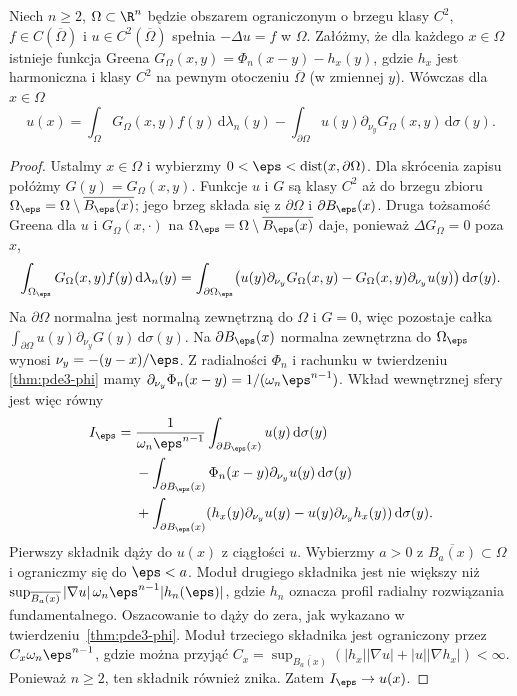 \begin{twierdzenie}
\label{thm:pde3-representation}
Niech $n\geq2$, $\Omega\subset\R^n$ będzie obszarem ograniczonym o brzegu klasy $C^2$, $f\in C(\overline\Omega)$
i $u\in C^2(\overline\Omega)$ spełnia $-\Delta u=f$
w $\Omega$. Załóżmy, że dla każdego $x\in\Omega$
istnieje funkcja Greena $G_\Omega(x,y)=\Phi_n(x-y)-h_x(y)$,
gdzie $h_x$ jest harmoniczna i klasy $C^2$ na pewnym
otoczeniu $\overline\Omega$ (w zmiennej $y$).
Wówczas dla $x\in\Omega$
\begin{equation}\label{eq:pde3-green-representation}
 u(x)=\int_\Omega G_\Omega(x,y)f(y)\,\mathrm d\lambda_n(y)
 -\int_{\partial\Omega}u(y)\partial_{\nu_y}G_\Omega(x,y)
 \,\mathrm d\sigma(y).
\end{equation}
\end{twierdzenie}
\begin{proof}
Ustalmy $x\in\Omega$ i wybierzmy
$0<\eps<\operatorname{dist}(x,\partial\Omega)$.
Dla skrócenia zapisu połóżmy $G(y)=G_\Omega(x,y)$.
Funkcje $u$ i $G$ są klasy $C^2$ aż do brzegu
zbioru $\Omega_\eps=\Omega\setminus\overline{B_\eps(x)}$;
jego brzeg składa się z $\partial\Omega$ i $\partial B_\eps(x)$.
Druga tożsamość Greena dla $u$ i $G_\Omega(x,\cdot)$
na $\Omega_\eps=\Omega\setminus\overline{B_\eps(x)}$
daje, ponieważ $\Delta G_\Omega=0$ poza $x$,
\[
 \int_{\Omega_\eps}G_\Omega(x,y)f(y)\,\mathrm d\lambda_n(y)
 =\int_{\partial\Omega_\eps}
 \bigl(u(y)\partial_{\nu_y}G_\Omega(x,y)
 -G_\Omega(x,y)\partial_{\nu_y}u(y)\bigr)
 \,\mathrm d\sigma(y).
\]
Na $\partial\Omega$ normalna jest normalną zewnętrzną
do $\Omega$ i $G=0$, więc pozostaje całka
$\int_{\partial\Omega}u(y)\partial_{\nu_y}G(y)\,
\mathrm d\sigma(y)$.
Na $\partial B_\eps(x)$ normalna zewnętrzna
do $\Omega_\eps$ wynosi $\nu_y=-(y-x)/\eps$.
Z radialności $\Phi_n$ i rachunku w twierdzeniu
\ref{thm:pde3-phi} mamy
$\partial_{\nu_y}\Phi_n(x-y)=1/(\omega_n\eps^{n-1})$.
Wkład wewnętrznej sfery jest więc równy
\[
 \begin{aligned}
 I_\eps={}&\frac1{\omega_n\eps^{n-1}}
 \int_{\partial B_\eps(x)}u(y)\,\mathrm d\sigma(y)\\
 &-\int_{\partial B_\eps(x)}
 \Phi_n(x-y)\partial_{\nu_y}u(y)\,\mathrm d\sigma(y)\\
 &+\int_{\partial B_\eps(x)}
 (h_x(y)\partial_{\nu_y}u(y)
 -u(y)\partial_{\nu_y}h_x(y))\,\mathrm d\sigma(y).
 \end{aligned}
\]
Pierwszy składnik dąży do $u(x)$ z ciągłości $u$.
Wybierzmy $a>0$ z $\overline{B_a(x)}\subset\Omega$
i ograniczmy się do $\eps<a$.
Moduł drugiego składnika jest nie większy niż
$\sup_{\overline{B_a(x)}}|\nabla u|\,
\omega_n\eps^{n-1}|h_n(\eps)|$, gdzie $h_n$
oznacza profil radialny rozwiązania fundamentalnego.
Oszacowanie to dąży do zera, jak wykazano
w twierdzeniu~\ref{thm:pde3-phi}.
Moduł trzeciego składnika jest ograniczony przez
$C_x\omega_n\eps^{n-1}$, gdzie można przyjąć
$C_x=\sup_{\overline{B_a(x)}}(|h_x||\nabla u|
+|u||\nabla h_x|)<\infty$.
Ponieważ $n\geq2$, ten składnik również znika.
Zatem $I_\eps\to u(x)$.


\end{proof}
